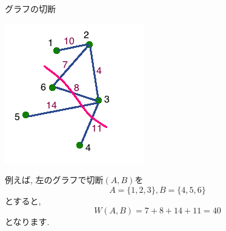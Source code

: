 \documentclass[dvipdfmx,11pt]{beamer}
\theoremstyle{definition}
\begin{document}
\begin{frame}{グラフの切断}
\begin{minipage}[c]{.35\textwidth}
\includegraphics[width=\textwidth]{images/graph_cut.png}
\end{minipage}
\begin{minipage}[c]{.6\textwidth}
例えば, 左のグラフで切断$(A, B)$を$$A=\{1,2,3\}, B=\{4,5,6\}$$とすると, 
$$W(A,B)=7+8+14+11=40$$
となります.
\end{minipage}

\end{frame}
\end{document}
